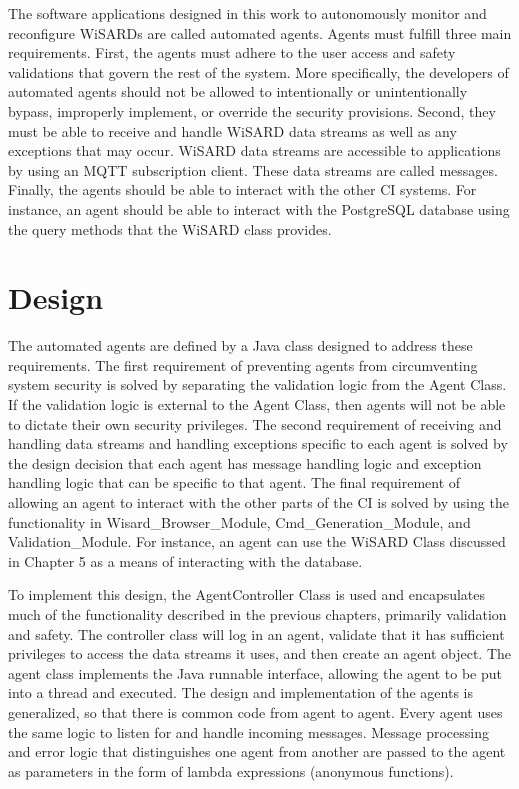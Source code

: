 The software applications designed in this work to autonomously monitor and reconfigure WiSARDs are called automated agents. Agents must fulfill three main requirements. First, the agents must adhere to the user access and safety validations that govern the rest of the system. More specifically, the developers of automated agents should not be allowed to intentionally or unintentionally bypass, improperly implement, or override the security provisions. Second, they must be able to receive and handle WiSARD data streams as well as any exceptions that may occur. WiSARD data streams are accessible to applications by using an MQTT subscription client. These data streams are called messages. Finally, the agents should be able to interact with the other CI systems. For instance, an agent should be able to interact with the PostgreSQL database using the query methods that the WiSARD class provides.

\section{Design}
The automated agents are defined by a Java class designed to address these requirements. The first requirement of preventing agents from circumventing system security is solved by separating the validation logic from the Agent Class. If the validation logic is external to the Agent Class, then agents will not be able to dictate their own security privileges. The second requirement of receiving and handling data streams and handling exceptions specific to each agent is solved by the design decision that each agent has message handling logic and exception handling logic that can be specific to that agent. The final requirement of allowing an agent to interact with the other parts of the CI  is solved by using the functionality in Wisard\_Browser\_Module, Cmd\_Generation\_Module, and Validation\_Module. For instance, an agent can use the WiSARD Class discussed in Chapter 5 as a means of interacting with the database.

To implement this design, the AgentController Class is used and encapsulates much of the functionality described in the previous chapters, primarily validation and safety. The controller class will log in an agent, validate that it has sufficient privileges to access the data streams it uses, and then create an agent object. The agent class implements the Java runnable interface, allowing the agent to be put into a thread and executed. The design and implementation of the agents is generalized, so that there is common code from agent to agent. Every agent uses the same logic to listen for and handle incoming messages. Message processing and error logic that distinguishes one agent from another are passed to the agent as parameters in the form of lambda expressions (anonymous functions).

